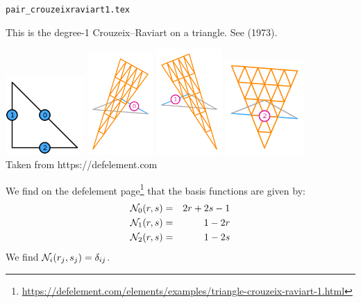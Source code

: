 \begin{flushright} {\tiny {\color{gray} \tt pair\_crouzeixraviart1.tex}} \end{flushright}

This is the degree-1 Crouzeix–Raviart on a triangle. See \textcite{crra73} (1973). 

\begin{center}
\includegraphics[width=3cm]{images/pair_crouzeix-raviart1/element-Crouzeix-Raviart-variant-equispaced-triangle-1-dofs}
\includegraphics[width=2.5cm]{images/pair_crouzeix-raviart1/element-Crouzeix-Raviart-variant-equispaced-triangle-1-0}
\includegraphics[width=2.5cm]{images/pair_crouzeix-raviart1/element-Crouzeix-Raviart-variant-equispaced-triangle-1-1}
\includegraphics[width=3cm]{images/pair_crouzeix-raviart1/element-Crouzeix-Raviart-variant-equispaced-triangle-1-2}\\
{\captionfont Taken from https://defelement.com}
\end{center}

We find on the defelement page\footnote{\url{https://defelement.com/elements/examples/triangle-crouzeix-raviart-1.html}}
that the basis functions are given by:
\begin{eqnarray}
{\mathcal{N}}_0(r,s)&=&2r+2s-1 \nonumber\\
{\mathcal{N}}_1(r,s)&=&1-2r \nonumber\\
{\mathcal{N}}_2(r,s)&=&1-2s \nonumber
\end{eqnarray}
We find ${\mathcal{N}}_i(r_j,s_j)=\delta_{ij}$.

